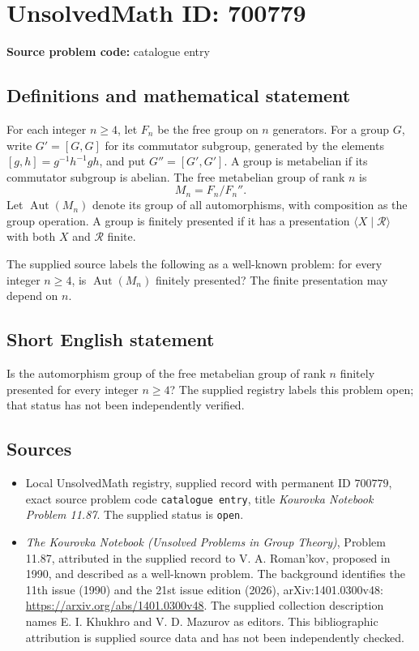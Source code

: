 \documentclass[11pt]{article}
\begin{document}
\section*{UnsolvedMath ID: 700779}
\textbf{Source problem code:} catalogue entry
\subsection{Definitions and mathematical statement}
For each integer \(n\geq 4\), let \(F_n\) be the free group on \(n\) generators. For a group \(G\), write \(G'=[G,G]\) for its commutator subgroup, generated by the elements \([g,h]=g^{-1}h^{-1}gh\), and put \(G''=[G',G']\). A group is metabelian if its commutator subgroup is abelian. The free metabelian group of rank \(n\) is
\[
M_n=F_n/F_n''.
\]
Let \(\operatorname{Aut}(M_n)\) denote its group of all automorphisms, with composition as the group operation. A group is finitely presented if it has a presentation \(\langle X\mid\mathcal R\rangle\) with both \(X\) and \(\mathcal R\) finite.

The supplied source labels the following as a well-known problem: for every integer \(n\geq 4\), is \(\operatorname{Aut}(M_n)\) finitely presented? The finite presentation may depend on \(n\).
\subsection{Short English statement}
Is the automorphism group of the free metabelian group of rank \(n\) finitely presented for every integer \(n\geq 4\)? The supplied registry labels this problem open; that status has not been independently verified.
\subsection{Sources}
\begin{itemize}
\item Local UnsolvedMath registry, supplied record with permanent ID \(700779\), exact source problem code \texttt{catalogue entry}, title \emph{Kourovka Notebook Problem 11.87}. The supplied status is \texttt{open}.
\item \emph{The Kourovka Notebook (Unsolved Problems in Group Theory)}, Problem 11.87, attributed in the supplied record to V. A. Roman'kov, proposed in 1990, and described as a well-known problem. The background identifies the 11th issue (1990) and the 21st issue edition (2026), arXiv:1401.0300v48: \url{https://arxiv.org/abs/1401.0300v48}. The supplied collection description names E. I. Khukhro and V. D. Mazurov as editors. This bibliographic attribution is supplied source data and has not been independently checked.
\end{itemize}
\end{document}

